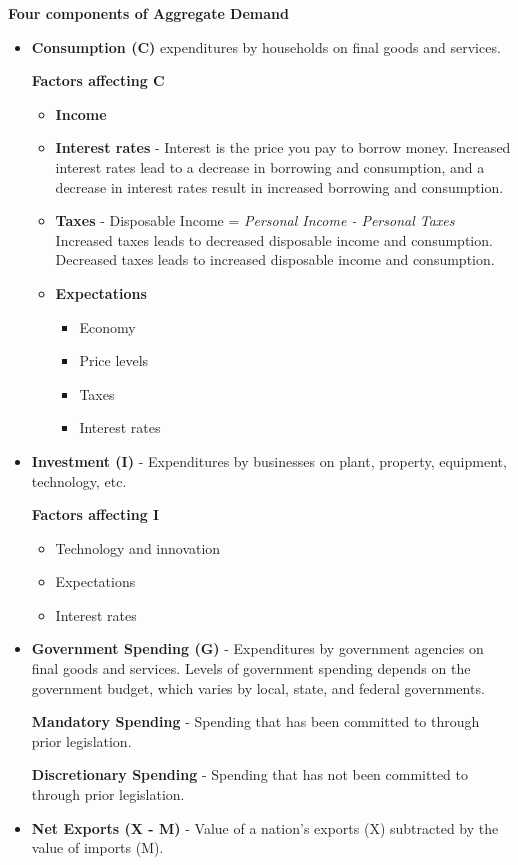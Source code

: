 \documentclass{article}
\begin{document}
\textbf{Four components of Aggregate Demand}
\begin{itemize}
    \item{\textbf{Consumption (C)}
    expenditures by households on final goods and services.
    
    \textbf{Factors affecting C}
    \begin{itemize}
        \item{\textbf{Income}}
        \item{\textbf{Interest rates} - Interest is the price you pay to borrow money. Increased interest rates lead to a decrease in borrowing and consumption, and a decrease in interest rates result in increased borrowing and  consumption.}
        \item{\textbf{Taxes} - Disposable Income  = \textit{Personal Income - Personal Taxes}
        Increased taxes leads to decreased disposable income and consumption. Decreased taxes leads to increased disposable income and consumption.}
        \item{\textbf{Expectations}
        \begin{itemize}
            \item{Economy}
            \item{Price levels}
            \item{Taxes}
            \item{Interest rates}
        \end{itemize}}
    \end{itemize}}
    \item{\textbf{Investment (I)} - Expenditures by businesses on plant, property, equipment, technology, etc.
    
    \textbf{Factors affecting I}
    \begin{itemize}
        \item{Technology and innovation}
        \item{Expectations}
        \item{Interest rates}
    \end{itemize}}
    \item{\textbf{Government Spending (G)} - Expenditures by government agencies on final goods and services. Levels of government spending depends on the government budget, which varies by local, state, and federal governments.
    
    \textbf{Mandatory Spending} - Spending that has been committed to through prior legislation.
    
    \textbf{Discretionary Spending} - Spending that has not been committed to through prior legislation.}
    \item{\textbf{Net Exports (X - M)} - Value of a nation's exports (X) subtracted by the value of imports (M).
    
}
\end{itemize}
\end{document}
